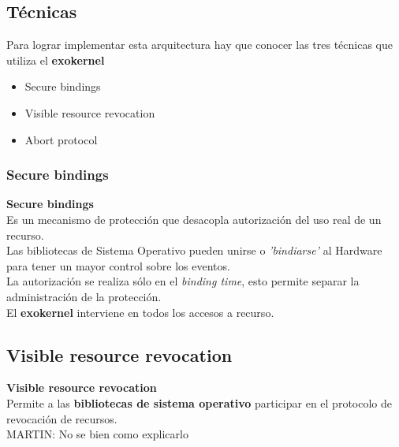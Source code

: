 \documentclass[10pt]{beamer}
\begin{document}
\subsection{Técnicas}
\begin{frame}
Para lograr implementar esta arquitectura hay que conocer las tres técnicas que utiliza el \textbf{exokernel} 

\begin{itemize}
  \item Secure bindings
  \item Visible resource revocation
  \item Abort protocol
\end{itemize}
\end{frame}


\subsubsection{Secure bindings}

\begin{frame}
\textbf{Secure bindings} \\[2em]

Es un mecanismo de protección que desacopla autorización del uso real de un recurso.\\[1em]

Las bibliotecas de Sistema Operativo pueden unirse o \textit{'bindiarse'} al Hardware para tener un mayor control sobre los eventos. \\[1em]  
La autorización se realiza sólo en el \textit{binding time}, esto permite separar la administración de la protección.\\[1em]

El \textbf{exokernel} interviene en todos los accesos a recurso.
\end{frame}

\subsection{Visible resource revocation}

\begin{frame}
\textbf{Visible resource revocation} \\[2em]

Permite a las \textbf{bibliotecas de sistema operativo} participar en el protocolo de revocación de recursos.\\[1em]

MARTIN: No se bien como explicarlo

\end{frame}
\end{document}
